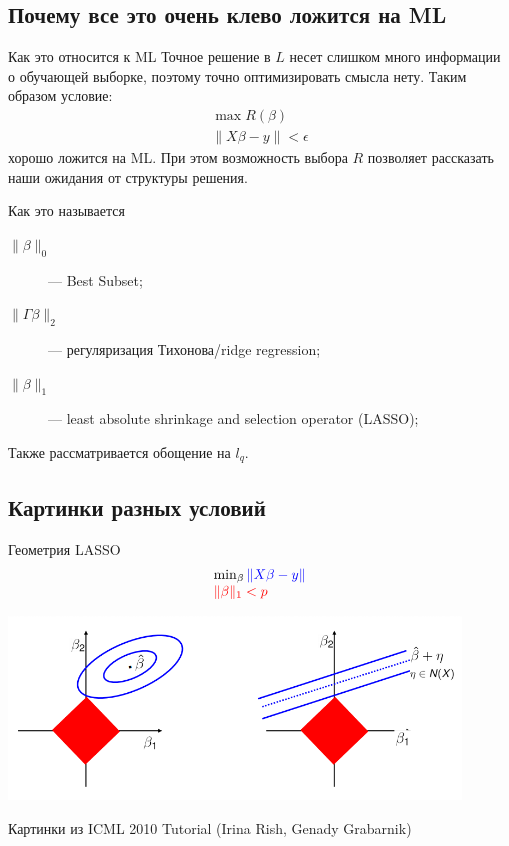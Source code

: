 \documentclass[14pt, fleqn, xcolor={dvipsnames, table}]{beamer}
\begin{document}
\subsection{Почему все это очень клево ложится на ML}
\begin{frame}{Как это относится к ML}
Точное решение в $L$ несет слишком много информации о обучающей выборке, поэтому точно оптимизировать смысла нету. Таким образом условие:
$$\begin{array}{l}
\max R(\beta) \\
\|X\beta - y\| < \epsilon
\end{array}$$
хорошо ложится на ML. При этом возможность выбора $R$ позволяет рассказать наши ожидания от структуры решения.
\end{frame}

\begin{frame}{Как это называется}
\begin{description}
  \item[$\|\beta\|_0$] --- Best Subset;
  \item[$\|\Gamma\beta\|_2$] --- регуляризация Тихонова/ridge regression;
  \item[$\|\beta\|_1$] --- least absolute shrinkage and selection operator (LASSO);
\end{description}
Также рассматривается обощение на $l_q$.
\end{frame}

\subsection{Картинки разных условий}

\begin{frame}{Геометрия LASSO}
$$\begin{array}{l}
\min_\beta {\color{blue} \|X\beta - y\|} \\
{\color{red} \|\beta\|_1 < p}
\end{array}$$
\begin{center}
\includegraphics[width=0.9\textwidth]{Geometric_View.png} 
\end{center}
\footnotesize
Картинки из ICML 2010 Tutorial (Irina Rish, Genady Grabarnik)
\end{frame}
\end{document}
